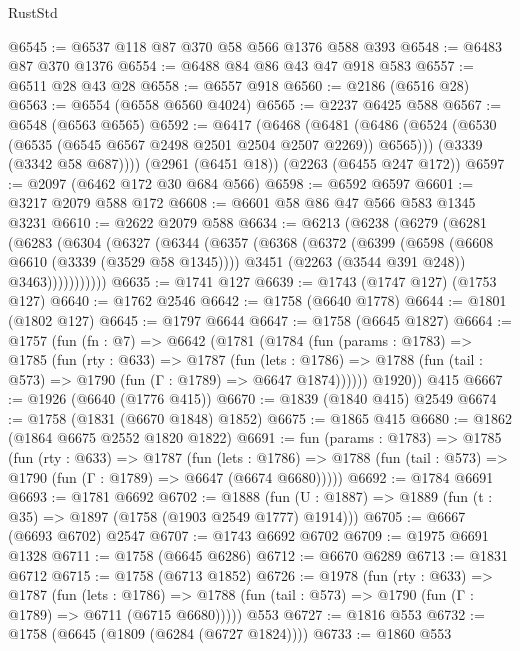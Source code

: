 \begin{lexlean}{RustStd}
\begin{coremodule}
@6545 := @6537 @118 @87 @370 @58 @566 @1376 @588 @393
@6548 := @6483 @87 @370 @1376
@6554 := @6488 @84 @86 @43 @47 @918 @583
@6557 := @6511 @28 @43 @28
@6558 := @6557 @918
@6560 := @2186 (@6516 @28)
@6563 := @6554 (@6558 @6560 @4024)
@6565 := @2237 @6425 @588
@6567 := @6548 (@6563 @6565)
@6592 := @6417
    (@6468
      (@6481
        (@6486 (@6524 (@6530 (@6535 (@6545 @6567 @2498 @2501 @2504 @2507 @2269)) @6565)))
        (@3339 (@3342 @58 @687))))
    (@2961 (@6451 @18))
    (@2263 (@6455 @247 @172))
@6597 := @2097 (@6462 @172 @30 @684 @566)
@6598 := @6592 @6597
@6601 := @3217 @2079 @588 @172
@6608 := @6601 @58 @86 @47 @566 @583 @1345 @3231
@6610 := @2622 @2079 @588
@6634 := @6213
    (@6238
      (@6279
        (@6281
          (@6283
            (@6304
              (@6327
                (@6344
                  (@6357
                    (@6368
                      (@6372
                        (@6399
                          (@6598 (@6608 @6610 (@3339 (@3529 @58 @1345))))
                          @3451
                          (@2263 (@3544 @391 @248))
                          @3463)))))))))))
@6635 := @1741 @127
@6639 := @1743 (@1747 @127) (@1753 @127)
@6640 := @1762 @2546
@6642 := @1758 (@6640 @1778)
@6644 := @1801 (@1802 @127)
@6645 := @1797 @6644
@6647 := @1758 (@6645 @1827)
@6664 := @1757
    (fun (fn : @7) =>
    @6642
      (@1781
        (@1784
          (fun (params : @1783) =>
          @1785
            (fun (rty : @633) =>
            @1787
              (fun (lets : @1786) =>
              @1788 (fun (tail : @573) => @1790 (fun (Γ : @1789) => @6647 @1874))))))
        @1920))
    @415
@6667 := @1926 (@6640 (@1776 @415))
@6670 := @1839 (@1840 @415) @2549
@6674 := @1758 (@1831 (@6670 @1848) @1852)
@6675 := @1865 @415
@6680 := @1862 (@1864 @6675 @2552 @1820 @1822)
@6691 := fun (params : @1783) =>
  @1785
    (fun (rty : @633) =>
    @1787
      (fun (lets : @1786) =>
      @1788 (fun (tail : @573) => @1790 (fun (Γ : @1789) => @6647 (@6674 @6680)))))
@6692 := @1784 @6691
@6693 := @1781 @6692
@6702 := @1888 (fun (U : @1887) => @1889 (fun (t : @35) => @1897 (@1758 (@1903 @2549 @1777) @1914)))
@6705 := @6667 (@6693 @6702) @2547
@6707 := @1743 @6692 @6702
@6709 := @1975 @6691 @1328
@6711 := @1758 (@6645 @6286)
@6712 := @6670 @6289
@6713 := @1831 @6712
@6715 := @1758 (@6713 @1852)
@6726 := @1978
    (fun (rty : @633) =>
    @1787
      (fun (lets : @1786) =>
      @1788 (fun (tail : @573) => @1790 (fun (Γ : @1789) => @6711 (@6715 @6680)))))
    @553
@6727 := @1816 @553
@6732 := @1758 (@6645 (@1809 (@6284 (@6727 @1824))))
@6733 := @1860 @553

\end{coremodule}
\end{lexlean}
